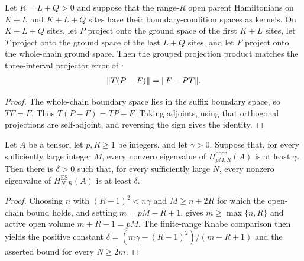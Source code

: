 \begin{lemma}
    \label{thm:ph_active_grouped_projector_error}
    \leanok
    Let $R=L+Q>0$ and suppose that the range-$R$ open parent Hamiltonians
    on $K+L$ and $K+L+Q$ sites have their boundary-condition spaces as kernels.
    On $K+L+Q$ sites, let $P$ project onto the ground space of the first
    $K+L$ sites, let $T$ project onto the ground space of the last $L+Q$
    sites, and let $F$ project onto the whole-chain ground space. Then the
    grouped projection product matches the three-interval projector error of
    \cite[condition C3$'$]{Nachtergaele1996Spectral}:
    \begin{align}
        \|T(P-F)\|=\|F-PT\|.
        \notag
    \end{align}
\end{lemma}
\begin{proof}
    \leanok
    The whole-chain boundary space lies in the suffix boundary space,
    so $TF=F$. Thus $T(P-F)=TP-F$. Taking adjoints, using that orthogonal
    projections are self-adjoint, and reversing the sign gives the identity.
\end{proof}

\begin{lemma}
    \label{thm:periodic_gap_from_divisible_open}
    \leanok
    Let $A$ be a tensor, let $p,R\geq 1$ be integers, and let $\gamma>0$.
    Suppose that, for every sufficiently large integer $M$, every nonzero
    eigenvalue of $H^{\mathrm{open}}_{pM,R}(A)$ is at least $\gamma$.
    Then there is $\delta>0$ such that, for every sufficiently large $N$,
    every nonzero eigenvalue of $H^{\mathrm{ES}}_{N,R}(A)$ is at least
    $\delta$.
\end{lemma}
\begin{proof}
    \leanok
    Choosing $n$ with $(R-1)^2<n\gamma$ and $M\geq n+2R$ for which the
    open-chain bound holds, and setting $m=pM-R+1$, gives $m\geq\max\{n,R\}$
    and active open volume $m+R-1=pM$. The finite-range Knabe comparison then
    yields the positive constant $\delta=(m\gamma-(R-1)^2)/(m-R+1)$ and the
    asserted bound for every $N\geq2m$.
\end{proof}

